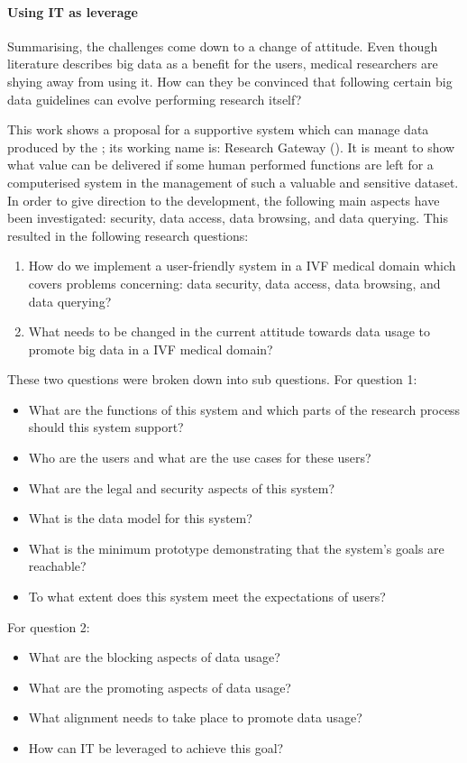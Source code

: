 \paragraph{Using IT as leverage}
Summarising, the challenges come down to a change of attitude.
Even though literature describes big data as a benefit for the users, medical researchers are shying away from using it.
How can they be convinced that following certain big data guidelines can evolve performing research itself?

This work shows a proposal for a supportive system which can manage data produced by the \project{}; its working name is: \project{} Research Gateway (\ivfsystem{}).
It is meant to show what value can be delivered if some human performed functions are left for a computerised system in the management of such a valuable and sensitive dataset.
In order to give direction to the development, the following main aspects have been investigated: security, data access, data browsing, and data querying.
This resulted in the following research questions:

\begin{enumerate}
	\item How do we implement a user-friendly system in a IVF medical domain which covers problems concerning: data security, data access, data browsing, and data querying?
	\item What needs to be changed in the current attitude towards data usage to promote big data in a IVF medical domain?
\end{enumerate}

These two questions were broken down into sub questions. 
For question 1:
\begin{itemize}
	\item What are the functions of this system and which parts of the research process should this system support?
	\item Who are the users and what are the use cases for these users?
	\item What are the legal and security aspects of this system?
	\item What is the data model for this system?
	\item What is the minimum prototype demonstrating that the system's goals are reachable?
	\item To what extent does this system meet the expectations of users?
\end{itemize}

For question 2:
\begin{itemize}
	\item What are the blocking aspects of data usage?
	\item What are the promoting aspects of data usage?
	\item What alignment needs to take place to promote data usage?
	\item How can IT be leveraged to achieve this goal?
\end{itemize}